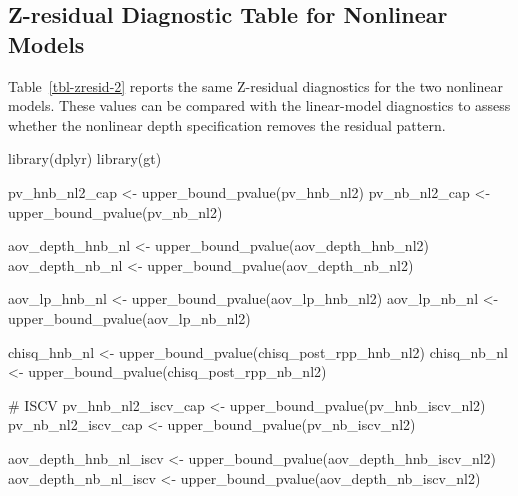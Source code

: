 \documentclass[
  english,
  letterpaper,
  DIV=11,
  numbers=noendperiod]{scrartcl}
\newenvironment{Shaded}{\begin{snugshade}}{\end{snugshade}}
\newcommand{\CommentTok}[1]{\textcolor[rgb]{0.37,0.37,0.37}{#1}}
\newcommand{\FunctionTok}[1]{\textcolor[rgb]{0.28,0.35,0.67}{#1}}
\newcommand{\NormalTok}[1]{\textcolor[rgb]{0.00,0.23,0.31}{#1}}
\newcommand{\OtherTok}[1]{\textcolor[rgb]{0.00,0.23,0.31}{#1}}
\begin{document}
\subsection{Z-residual Diagnostic Table for Nonlinear
Models}\label{z-residual-diagnostic-table-for-nonlinear-models}

Table~\ref{tbl-zresid-2} reports the same Z-residual diagnostics for the
two nonlinear models. These values can be compared with the linear-model
diagnostics to assess whether the nonlinear depth specification removes
the residual pattern.

\begin{Shaded}
\begin{Highlighting}[]
\FunctionTok{library}\NormalTok{(dplyr)}
\FunctionTok{library}\NormalTok{(gt)}

\NormalTok{pv\_hnb\_nl2\_cap }\OtherTok{\textless{}{-}} \FunctionTok{upper\_bound\_pvalue}\NormalTok{(pv\_hnb\_nl2)}
\NormalTok{pv\_nb\_nl2\_cap  }\OtherTok{\textless{}{-}} \FunctionTok{upper\_bound\_pvalue}\NormalTok{(pv\_nb\_nl2)}

\NormalTok{aov\_depth\_hnb\_nl }\OtherTok{\textless{}{-}} \FunctionTok{upper\_bound\_pvalue}\NormalTok{(aov\_depth\_hnb\_nl2)}
\NormalTok{aov\_depth\_nb\_nl  }\OtherTok{\textless{}{-}} \FunctionTok{upper\_bound\_pvalue}\NormalTok{(aov\_depth\_nb\_nl2)}

\NormalTok{aov\_lp\_hnb\_nl }\OtherTok{\textless{}{-}} \FunctionTok{upper\_bound\_pvalue}\NormalTok{(aov\_lp\_hnb\_nl2)}
\NormalTok{aov\_lp\_nb\_nl  }\OtherTok{\textless{}{-}} \FunctionTok{upper\_bound\_pvalue}\NormalTok{(aov\_lp\_nb\_nl2)}

\NormalTok{chisq\_hnb\_nl }\OtherTok{\textless{}{-}} \FunctionTok{upper\_bound\_pvalue}\NormalTok{(chisq\_post\_rpp\_hnb\_nl2)}
\NormalTok{chisq\_nb\_nl  }\OtherTok{\textless{}{-}} \FunctionTok{upper\_bound\_pvalue}\NormalTok{(chisq\_post\_rpp\_nb\_nl2)}

\CommentTok{\# ISCV}
\NormalTok{pv\_hnb\_nl2\_iscv\_cap }\OtherTok{\textless{}{-}} \FunctionTok{upper\_bound\_pvalue}\NormalTok{(pv\_hnb\_iscv\_nl2)}
\NormalTok{pv\_nb\_nl2\_iscv\_cap  }\OtherTok{\textless{}{-}} \FunctionTok{upper\_bound\_pvalue}\NormalTok{(pv\_nb\_iscv\_nl2)}

\NormalTok{aov\_depth\_hnb\_nl\_iscv }\OtherTok{\textless{}{-}} \FunctionTok{upper\_bound\_pvalue}\NormalTok{(aov\_depth\_hnb\_iscv\_nl2)}
\NormalTok{aov\_depth\_nb\_nl\_iscv  }\OtherTok{\textless{}{-}} \FunctionTok{upper\_bound\_pvalue}\NormalTok{(aov\_depth\_nb\_iscv\_nl2)}


\end{Highlighting}
\end{Shaded}
\end{document}
